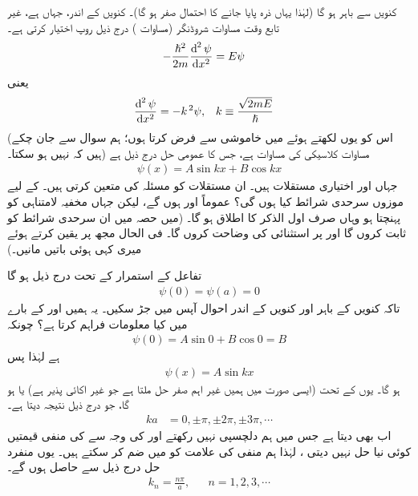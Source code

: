 کنویں سے باہر  ہو گا  (لہٰذا یہاں ذرہ پایا جانے کا احتمال صفر ہو گا)۔ کنویں کے اندر، جہاں  ہے، غیر تابع وقت مساوات شروڈنگر (مساوات ) درج ذیل روپ اختیار کرتی ہے۔
\begin{align}
-\frac{\hslash^{2}}{2m}\frac{\dif^{\,2}\psi}{\dif x^{2}}&=E\psi
\end{align} 
یعنی
\begin{align}\label{مساوات_شروڈنگر_کلاسیکی_ہارمونی_مرتعش}
\frac{\dif^{\,2}\psi}{\dif x^{2}}&=-k^{\,2}\psi, && k\equiv \frac{\sqrt{2mE}}{\hslash}
\end{align}
(اس کو یوں لکھتے ہوئے میں خاموشی سے  فرض کرتا ہوں؛ ہم سوال  سے جان چکے ہیں کہ   نہیں ہو سکتا۔)  مساوات  کلاسیکی  کی مساوات ہے،  جس کا عمومی حل درج ذیل ہے
\begin{align}
\psi(x)=A\sin kx+B\cos kx
\end{align}
 جہاں  اور  اختیاری مستقلات ہیں۔ ان مستقلات کو مسئلہ کی   متعین کرتی ہیں۔  کے لیے موزوں سرحدی شرائط کیا ہوں گی؟ عموماً  اور   ہوں گے، لیکن جہاں مخفیہ لامتناہی کو پہنچتا ہو وہاں صرف اول الذکر کا اطلاق ہو گا۔ (میں حصہ  میں ان سرحدی شرائط کو ثابت کروں گا اور   پر  استثنائی   کی وضاحت کروں گا۔ فی الحال مجھ پر یقین کرتے ہوئے میری کہی ہوئی باتیں  مانیں۔)  

تفاعل  کے استمرار  کے تحت درج ذیل ہو گا
\begin{align}
\psi(0)=\psi(a)=0
\end{align} 
تاکہ  کنویں کے باہر اور کنویں کے اندر احوال   آپس میں جڑ سکیں۔ یہ ہمیں    اور   کے بارے میں کیا معلومات فراہم کرتا ہے؟ چونکہ
\begin{align*}
\psi(0)=A\sin 0+B\cos 0=B
\end{align*}
ہے لہٰذا    پس
\begin{align}
\psi(x)=A\sin kx
\end{align}
ہو گا۔ یوں  کے تحت  (ایسی صورت میں ہمیں غیر اہم  صفر حل     ملتا ہے جو غیر اکائی پذیر ہے) یا   ہو گا، جو درج ذیل   نتیجہ دیتا ہے۔
\begin{align}
ka&=0,\pm\pi,\pm2\pi,\pm3\pi,\cdots
\end{align} 
اب  بھی   دیتا ہے جس میں ہم دلچسپی نہیں رکھتے اور   کی وجہ سے  کی منفی قیمتیں کوئی نیا حل نہیں دیتی ، لہٰذا ہم منفی کی علامت کو  میں ضم کر سکتے ہیں۔ یوں منفرد حل درج ذیل  سے حاصل ہوں گے۔ 
\begin{align}
k_{n}=\frac{n\pi}{a},&& n=1,2,3,\cdots
\end{align}

